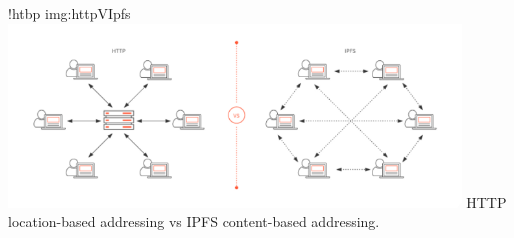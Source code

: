 \namedfigure
{!htbp}
{img:httpVIpfs}
{\includegraphics[width=0.9\textwidth]{resources/images/http-vs-ipfs.png}}
{HTTP location-based addressing vs IPFS content-based addressing.}
